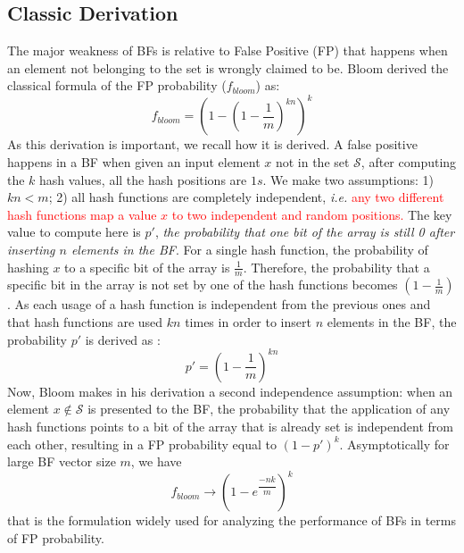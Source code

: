 \subsection{Classic Derivation}
The major weakness of BFs is relative to False Positive (FP) that happens when an element not belonging to the set is wrongly claimed to be. Bloom derived the classical formula of the FP probability ($f_{bloom}$) as:
\begin{equation}
\label{oldFormula}
f_{bloom}= \left(1 - \left(1 - \frac{1}{m}\right)^{kn}\right)^k
\end{equation}
As this derivation is important, we recall how it is derived. A false positive happens in a BF when given an input element $x$ not in the set $\mathcal{S}$, after computing the $k$ hash values, all the hash positions are $1s$. We make two assumptions: 1) $kn<m$; 2) all hash functions are completely independent, {\em i.e.} \textcolor{red}{any two different hash functions map a value $x$ to two independent and random positions.}
The key value to compute here is $p'$, \textit{the probability that one bit of the array is still 0 after inserting $n$ elements in the BF}. For a single hash function, the probability of hashing $x$ to a specific bit of the array is $\frac{1}{m}$. Therefore, the probability that a specific bit in the array is not set by one of the hash functions becomes $(1-\frac{1}{m})$. As each usage of a hash function is independent from the previous ones and that hash functions are used $kn$ times in order to insert $n$ elements in the BF, the probability $p'$ is derived as :
\begin{equation}
\label{p'form}
p'=\left(1-\frac{1}{m}\right)^{kn}
\end{equation}
Now, Bloom makes in his derivation a second independence assumption: when an element $x \notin \mathcal{S}$ is presented to the BF, the probability that the application of any hash functions points to a bit of the array that is already set is independent from each other, resulting in a FP probability equal to $(1-p')^k$. Asymptotically for large BF vector size $m$, we have
\begin{equation}
\label{fBloom}
f_{bloom} \rightarrow \left( 1-e^{\dfrac{-nk}{m}} \right)^k
\end{equation}
that is the formulation widely used for analyzing the performance of BFs in terms of FP probability.
